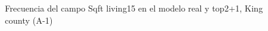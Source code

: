\begin{figure}[H]
    \centering
    
    \caption{Frecuencia del campo Sqft living15 en el modelo real y top2+1, King county (A-1)}
    \label{frecuency-top2+1-sqft living15}
\end{figure}